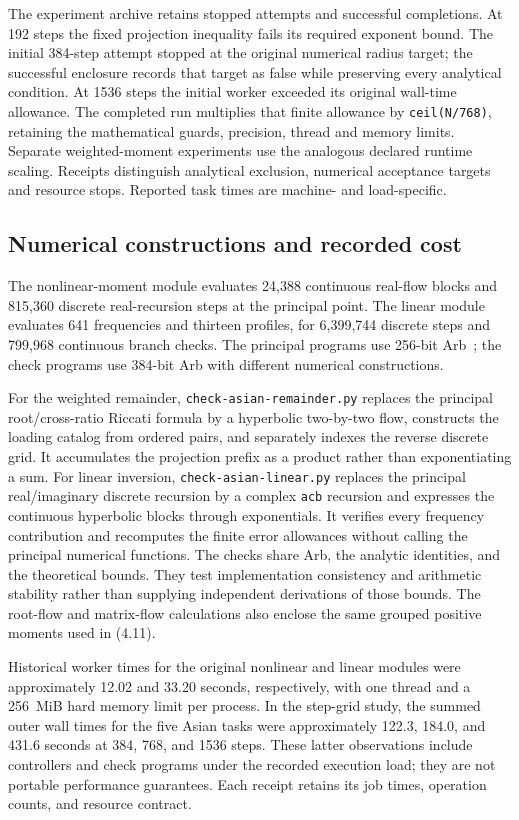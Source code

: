\documentclass[11pt,a4paper]{article}
\begin{document}
The experiment archive retains stopped attempts and successful completions.
At 192 steps the fixed projection inequality fails its required exponent bound.
The initial 384-step attempt stopped at the original numerical radius target;
the successful enclosure records that target as false while preserving every
analytical condition. At 1536 steps the initial worker exceeded its original
wall-time allowance. The completed run multiplies that finite allowance by
\texttt{ceil(N/768)}, retaining the mathematical guards, precision, thread and
memory limits. Separate weighted-moment experiments use the analogous declared
runtime scaling. Receipts distinguish analytical exclusion, numerical acceptance
targets and resource stops. Reported task times are machine- and load-specific.


\subsection{Numerical constructions and recorded cost}


The nonlinear-moment module evaluates 24,388 continuous real-flow blocks and
815,360 discrete real-recursion steps at the principal point. The linear module
evaluates 641 frequencies and thirteen profiles, for 6,399,744 discrete steps
and 799,968 continuous branch checks. The principal programs use 256-bit
Arb~\cite{Johansson2017}; the check programs use 384-bit Arb with different
numerical constructions.

For the weighted remainder, \texttt{check-asian-remainder.py} replaces the
principal root/cross-ratio Riccati formula by a hyperbolic two-by-two flow,
constructs the loading catalog from ordered pairs, and separately indexes the
reverse discrete grid. It accumulates the projection prefix as a product rather
than exponentiating a sum. For linear inversion,
\texttt{check-asian-linear.py} replaces the principal real/imaginary discrete
recursion by a complex \texttt{acb} recursion and expresses the continuous
hyperbolic blocks through exponentials. It verifies every frequency contribution
and recomputes the finite error allowances without calling the principal
numerical functions. The checks share Arb, the analytic identities, and the
theoretical bounds. They test implementation consistency and arithmetic
stability rather than supplying independent derivations of those bounds.
The root-flow and matrix-flow calculations also enclose the same grouped
positive moments used in (4.11).

Historical worker times for the original nonlinear and linear modules were
approximately 12.02 and 33.20 seconds, respectively, with one thread and a
256~MiB hard memory limit per process. In the step-grid study, the summed
outer wall times for the five Asian tasks were approximately 122.3, 184.0,
and 431.6 seconds at 384, 768, and 1536 steps. These latter observations
include controllers and check programs under the recorded execution load;
they are not portable performance guarantees. Each receipt retains its job
times, operation counts, and resource contract.
\end{document}
